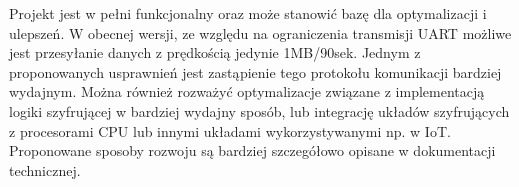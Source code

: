 Projekt jest w pełni funkcjonalny oraz może stanowić bazę dla optymalizacji i ulepszeń. W obecnej wersji, ze względu na ograniczenia transmisji UART możliwe jest przesyłanie danych z prędkością jedynie 1MB/90sek. Jednym z proponowanych usprawnień jest zastąpienie tego protokołu komunikacji bardziej wydajnym. Można również rozważyć optymalizacje związane z implementacją logiki szyfrującej w bardziej wydajny sposób, lub integrację układów szyfrujących z procesorami CPU lub innymi układami wykorzystywanymi np. w IoT. Proponowane sposoby rozwoju są bardziej szczegółowo opisane w dokumentacji technicznej.

\newpage
